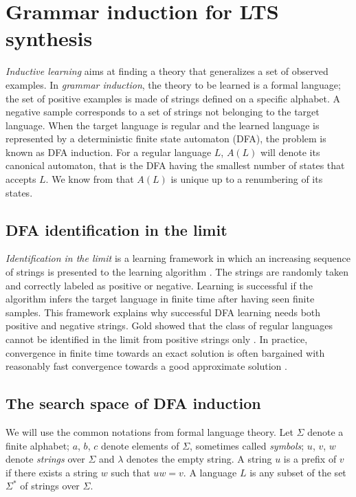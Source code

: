 \section{Grammar induction for LTS synthesis\label{section:inductive-background}}

\emph{Inductive learning} aims at finding a theory that generalizes a set of observed examples. In \emph{grammar induction}, the theory to be learned is a formal language; the set of positive examples is made of strings defined on a specific alphabet. A negative sample corresponds to a set of strings not belonging to the target language. When the target language is regular and the learned language is represented by a deterministic finite state automaton (DFA), the problem is known as DFA induction. For a regular language $L$, $A(L)$ will denote its canonical automaton, that is the DFA having the smallest number of states that accepts $L$. We know from \cite{Hopcroft:1979} that $A(L)$ is unique up to a renumbering of its states.

\subsection{DFA identification in the limit\label{subsection:dfa-identification-in-the-limit}}

\emph{Identification in the limit} is a learning framework in which an increasing sequence of strings is presented to the learning algorithm \cite{Gold:1967}. The strings are randomly taken and correctly labeled as positive or negative. Learning is successful if the algorithm infers the target language in finite time after having seen finite samples. This framework explains why successful DFA learning needs both positive and negative strings. Gold showed that the class of regular languages cannot be identified in the limit from positive strings only \cite{Gold:1967}. In practice, convergence in finite time towards an exact solution is often bargained with reasonably fast convergence towards a good approximate solution \cite{Lang:1992}.

\subsection{The search space of DFA induction\label{subsection:gi-background-search-space}}

We will use the common notations from formal language theory. Let $\Sigma$ denote a finite alphabet; $a$, $b$, $c$ denote elements of $\Sigma$, sometimes called \emph{symbols}; $u$, $v$, $w$ denote \emph{strings} over $\Sigma$ and $\lambda$ denotes the empty string. A string $u$ is a prefix of $v$ if there exists a string $w$ such that $uw = v$. A language $L$ is any subset of the set $\Sigma^*$ of strings over $\Sigma$. 

